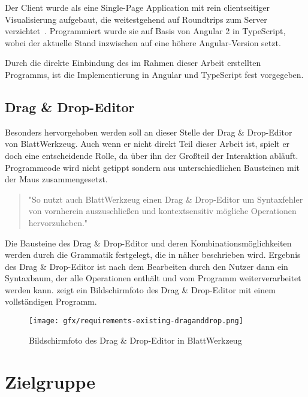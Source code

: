 Der Client wurde als eine Single-Page Application mit rein clientseitiger Visualisierung aufgebaut, die weitestgehend auf Roundtrips zum Server verzichtet~\cite[94-95]{riemer2016}. Programmiert wurde sie auf Basis von Angular 2 in TypeScript, wobei der aktuelle Stand inzwischen auf eine höhere Angular-Version setzt.

Durch die direkte Einbindung des im Rahmen dieser Arbeit erstellten Programms, ist die Implementierung in Angular und TypeScript fest vorgegeben.

\subsection{Drag \& Drop-Editor}

Besonders hervorgehoben werden soll an dieser Stelle der Drag \& Drop-Editor von BlattWerkzeug. Auch wenn er nicht direkt Teil dieser Arbeit ist, spielt er doch eine entscheidende Rolle, da über ihn der Großteil der Interaktion abläuft. Programmcode wird nicht getippt sondern aus unterschiedlichen Bausteinen mit der Maus zusammengesetzt.

\begin{quote}
    "So nutzt auch BlattWerkzeug einen Drag \& Drop-Editor um Syntaxfehler von vornherein auszuschließen und kontextsensitiv mögliche Operationen hervorzuheben."~\cite[6]{riemer2016}
\end{quote}

Die Bausteine des Drag \& Drop-Editor und deren Kombinationsmöglichkeiten werden durch die Grammatik festgelegt, die in  näher beschrieben wird. Ergebnis des Drag \& Drop-Editor ist nach dem Bearbeiten durch den Nutzer dann ein Syntaxbaum, der alle Operationen enthält und vom Programm weiterverarbeitet werden kann.  zeigt ein Bildschirmfoto des Drag \& Drop-Editor mit einem vollständigen Programm.

\begin{figure}[h]
    \centering
    \texttt{[image: gfx/requirements-existing-draganddrop.png]}
    \caption{Bildschirmfoto des Drag \& Drop-Editor in BlattWerkzeug}
    \label{fig:requirements:existing:draganddrop}
\end{figure}

\section{Zielgruppe}
\label{sec:requirements:target}

